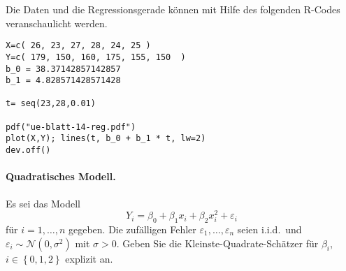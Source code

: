 Die Daten und die Regressionsgerade können mit Hilfe des folgenden R-Codes veranschaulicht werden. 
\begin{lstlisting}
X=c( 26, 23, 27, 28, 24, 25 )
Y=c( 179, 150, 160, 175, 155, 150  )
b_0 = 38.37142857142857
b_1 = 4.828571428571428

t= seq(23,28,0.01)

pdf("ue-blatt-14-reg.pdf")
plot(X,Y); lines(t, b_0 + b_1 * t, lw=2)
dev.off()
\end{lstlisting}








\paragraph{Quadratisches Modell. }  Es sei das Modell
\begin{equation}
    Y_i = \beta_0 + \beta_1 x_i + \beta_2 x_{i}^2 + \varepsilon_i
\end{equation}
für $i=1,\ldots,n$ gegeben. Die zufälligen Fehler $\varepsilon_1,\ldots,\varepsilon_n$ 
seien i.i.d.\ und $\varepsilon_i\sim \mathcal N(0,\sigma^2)$ mit $\sigma>0$.
Geben Sie die Kleinste-Quadrate-Schätzer für $\beta_i$, $i\in \left\{ 0,1,2 \right\}$ explizit an.

